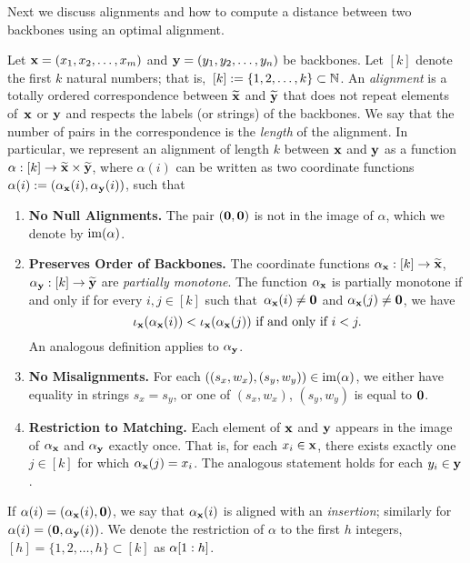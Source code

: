 Next we discuss alignments and how to compute a distance between two backbones using an optimal alignment.

\begin{defn}[Alignment]\label{def:alignment}
    Let $\textbf{x} = (x_1,x_2,\dots, x_m)$ and $\textbf{y} = (y_1,y_2,\dots, y_n)$ be
    backbones.
    Let $[k]$ denote the first $k$ natural numbers; that is,~$[k]:=\{ 1, 2, \dots, k\} \subset \mbox{$\mathbb N$}$.
    An \emph{alignment} is a totally ordered correspondence between $\widetilde{\textbf{x}}$ and
    $\widetilde{\textbf{y}}$ that does not repeat elements of~$\textbf{x}$ or $\textbf{y}$ and respects the
    labels (or strings) of the backbones. We say that the
    number of pairs in the correspondence is the \emph{length} of the alignment.
    In particular, we represent an alignment of length $k$ between $\textbf{x}$ and
    $\textbf{y}$ as a  function $\alpha: [k] \to \widetilde{\textbf{x}} \times \widetilde{\textbf{y}}$,
    where $\alpha(i)$ can be written as two coordinate
    functions~$\alpha(i):= (\alpha_{\textbf{x}}(i), \alpha_{\textbf{y}}(i))$, such that
    \begin{enumerate}
        \item \textbf{No Null Alignments.} The pair $({\mathbf{0}},{\mathbf{0}})$ is not in the image of
            $\alpha$, which we denote by $\operatorname{im}(\alpha)$. \label{property:nullalignments}
        \item \textbf{Preserves Order of Backbones.} The coordinate functions $\alpha_{\textbf{x}}: [k] \to \widetilde{\textbf{x}}$, $\alpha_{\textbf{y}}:
            [k]\rightarrow \widetilde{\textbf{y}}$ are \emph{partially monotone}. The
            function $\alpha_{\textbf{x}}$ is partially monotone if and only if for every
            $i,j \in [k]$ such that~$\alpha_{\textbf{x}}(i)\neq {\mathbf{0}}$ and $\alpha_{\textbf{x}}(j) \neq
            {\mathbf{0}}$, we have
            $$
                \iota_{\textbf{x}}(\alpha_{\textbf{x}}(i)) < \iota_{\textbf{x}}(\alpha_{\textbf{x}}(j))
                \text{ if and only if } i < j.
            $$
            An analogous definition applies to $\alpha_{\textbf{y}}$. \label{property:preservesbackbones}
        \item \textbf{No Misalignments.}
            For each $\left((s_x,w_x),(s_y,w_y)\right) \in \operatorname{im}(\alpha)$,
            we either have equality in strings \mbox{$s_x = s_y$}, or one of $(s_x, w_x)$, $(s_y, w_y)$ is equal to ${\mathbf{0}}$.  
            \label{property:nomisalignments}

        \item \textbf{Restriction to Matching.} Each element of $\textbf{x}$ and $\textbf{y}$ appears in the image of $\alpha_{\textbf{x}}$ and $\alpha_{\textbf{y}}$ exactly once. That is, for each $x_i \in \textbf{x}$, there exists exactly one $j \in [k]$ for which $\alpha_{\textbf{x}}(j)=x_i$. The analogous statement holds for each $y_i \in \textbf{y}$. \label{property:restrictiontomatching}
    \end{enumerate}
    If $\alpha(i)=(\alpha_{\textbf{x}}(i), {\mathbf{0}})$, we say that $\alpha_{\textbf{x}}(i)$ is aligned
    with an \emph{insertion}; similarly for $\alpha(i)=({\mathbf{0}},\alpha_{\textbf{y}}(i))$. We
    denote the restriction of $\alpha$ to the first $h$ integers, $[h] =\{1, 2,
    \dots, h\} \subset [k]$ as $\alpha[1:h]$.
\end{defn}

